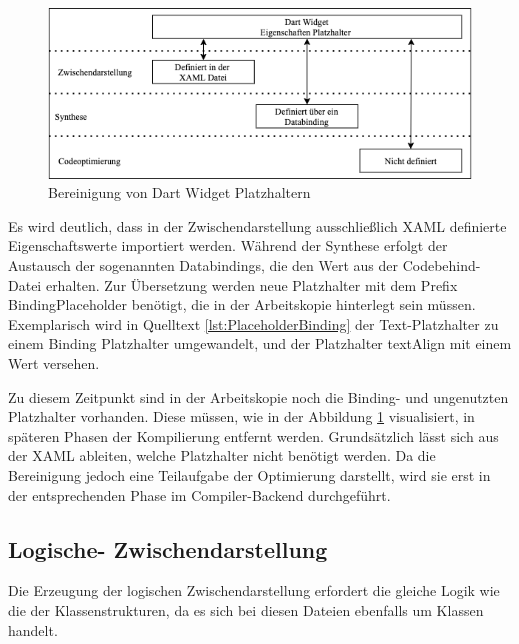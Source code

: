 \newpage
\begin{figure}[!ht]
 \includegraphics[width=\textwidth,keepaspectratio]{Images/Implementation/DartPlaceHolder.png}
 \caption{Bereinigung von Dart Widget Platzhaltern}
 \label{fig:PlaceholderOptions}
\end{figure}
Es wird deutlich, dass in der Zwischendarstellung ausschließlich XAML definierte Eigenschaftswerte 
importiert werden.  Während der Synthese erfolgt der Austausch der sogenannten Databindings, die den Wert aus der Codebehind-Datei erhalten.  Zur Übersetzung werden neue Platzhalter mit dem Prefix \glq BindingPlaceholder \grq{} benötigt,  die in der Arbeitskopie hinterlegt sein müssen. Exemplarisch wird in Quelltext  \ref{lst:PlaceholderBinding} der Text-Platzhalter zu einem Binding Platzhalter umgewandelt,  und der Platzhalter textAlign mit einem Wert versehen. 

 

Zu diesem Zeitpunkt sind in der Arbeitskopie noch die Binding- und ungenutzten Platzhalter vorhanden.  Diese müssen, wie in der Abbildung \ref{fig:PlaceholderOptions} visualisiert,  in späteren Phasen der Kompilierung entfernt werden.  Grundsätzlich lässt sich aus der XAML ableiten,  welche Platzhalter nicht benötigt werden.  Da die Bereinigung jedoch eine Teilaufgabe der Optimierung darstellt, wird sie erst in der entsprechenden Phase im Compiler-Backend durchgeführt. 

\subsection{Logische- Zwischendarstellung}

Die Erzeugung der logischen Zwischendarstellung erfordert die gleiche Logik wie die der Klassenstrukturen,  da es sich bei diesen Dateien ebenfalls um \Csharp Klassen handelt.  

